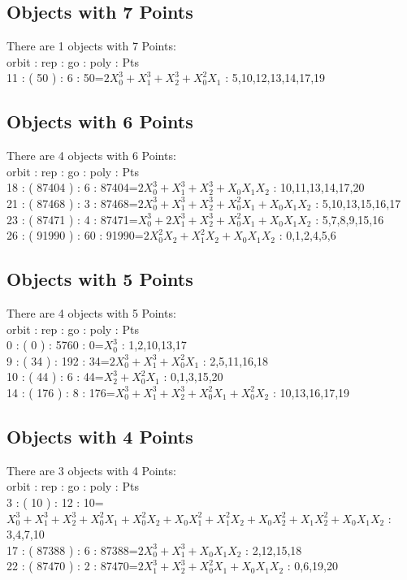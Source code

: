 \subsection*{Objects with 7 Points}
There are 1 objects with 7 Points: \\
orbit : rep : go : poly : Pts\\
11 : ( 50 ) : 6 : 50=$2X_0^3 + X_1^3 + X_2^3 + X_0^2X_1$ : 5,10,12,13,14,17,19\\
\subsection*{Objects with 6 Points}
There are 4 objects with 6 Points: \\
orbit : rep : go : poly : Pts\\
18 : ( 87404 ) : 6 : 87404=$2X_0^3 + X_1^3 + X_2^3 + X_0X_1X_2$ : 10,11,13,14,17,20\\
21 : ( 87468 ) : 3 : 87468=$2X_0^3 + X_1^3 + X_2^3 + X_0^2X_1 + X_0X_1X_2$ : 5,10,13,15,16,17\\
23 : ( 87471 ) : 4 : 87471=$X_0^3 + 2X_1^3 + X_2^3 + X_0^2X_1 + X_0X_1X_2$ : 5,7,8,9,15,16\\
26 : ( 91990 ) : 60 : 91990=$2X_0^2X_2 + X_1^2X_2 + X_0X_1X_2$ : 0,1,2,4,5,6\\
\subsection*{Objects with 5 Points}
There are 4 objects with 5 Points: \\
orbit : rep : go : poly : Pts\\
0 : ( 0 ) : 5760 : 0=$X_0^3$ : 1,2,10,13,17\\
9 : ( 34 ) : 192 : 34=$2X_0^3 + X_1^3 + X_0^2X_1$ : 2,5,11,16,18\\
10 : ( 44 ) : 6 : 44=$X_2^3 + X_0^2X_1$ : 0,1,3,15,20\\
14 : ( 176 ) : 8 : 176=$X_0^3 + X_1^3 + X_2^3 + X_0^2X_1 + X_0^2X_2$ : 10,13,16,17,19\\
\subsection*{Objects with 4 Points}
There are 3 objects with 4 Points: \\
orbit : rep : go : poly : Pts\\
3 : ( 10 ) : 12 : 10=$X_0^3 + X_1^3 + X_2^3 + X_0^2X_1 + X_0^2X_2 + X_0X_1^2 + X_1^2X_2 + X_0X_2^2 + X_1X_2^2 + X_0X_1X_2$ : 3,4,7,10\\
17 : ( 87388 ) : 6 : 87388=$2X_0^3 + X_1^3 + X_0X_1X_2$ : 2,12,15,18\\
22 : ( 87470 ) : 2 : 87470=$2X_1^3 + X_2^3 + X_0^2X_1 + X_0X_1X_2$ : 0,6,19,20\\
